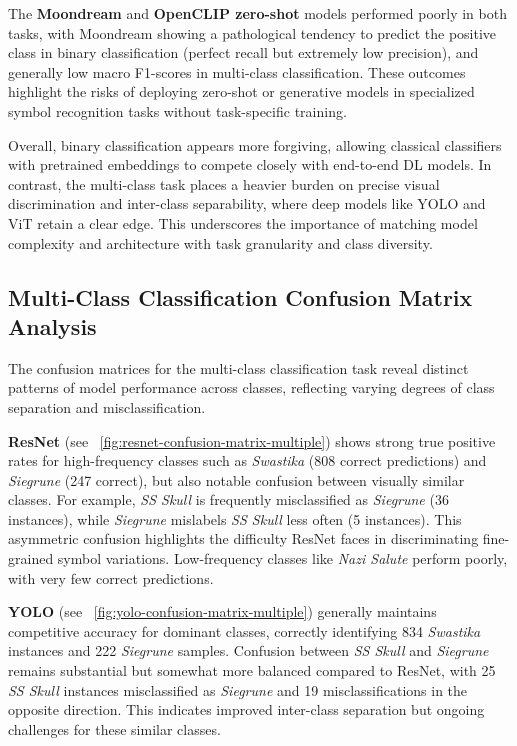 The \textbf{Moondream} and \textbf{OpenCLIP zero-shot} models performed poorly in both tasks, with Moondream showing
a pathological tendency to predict the positive class in binary classification (perfect recall but extremely low
precision), and generally low macro F1-scores in multi-class classification. These outcomes highlight the risks of
deploying zero-shot or generative models in specialized symbol recognition tasks without task-specific training.

Overall, binary classification appears more forgiving, allowing classical classifiers with pretrained embeddings to
compete closely with end-to-end \ac{DL} models. In contrast, the multi-class task places a heavier burden on
precise visual discrimination and inter-class separability, where deep models like \ac{YOLO} and \ac{ViT} retain a clear
edge. This underscores the importance of matching model complexity and architecture with task granularity and class
diversity.

\subsection{Multi-Class Classification Confusion Matrix Analysis}

The confusion matrices for the multi-class classification task reveal distinct patterns of model performance across
classes, reflecting varying degrees of class separation and misclassification.

\textbf{\ac{ResNet}} (see ~\autoref{fig:resnet-confusion-matrix-multiple}) shows strong true positive rates for
high-frequency classes such as \textit{Swastika} (808 correct predictions) and \textit{Siegrune} (247 correct), but
also notable confusion between visually similar classes. For example, \textit{SS Skull} is frequently misclassified as
\textit{Siegrune} (36 instances), while \textit{Siegrune} mislabels \textit{SS Skull} less often (5 instances). This
asymmetric confusion highlights the difficulty \ac{ResNet} faces in discriminating fine-grained symbol variations.
Low-frequency classes like \textit{Nazi Salute} perform poorly, with very few correct predictions.

\textbf{\ac{YOLO}} (see ~\autoref{fig:yolo-confusion-matrix-multiple}) generally maintains competitive accuracy for
dominant classes, correctly identifying 834 \textit{Swastika} instances and 222 \textit{Siegrune} samples. Confusion
between \textit{SS Skull} and \textit{Siegrune} remains substantial but somewhat more balanced compared to
\ac{ResNet}, with 25 \textit{SS Skull} instances misclassified as \textit{Siegrune} and 19 misclassifications in the
opposite direction. This indicates improved inter-class separation but ongoing challenges for these similar classes.

